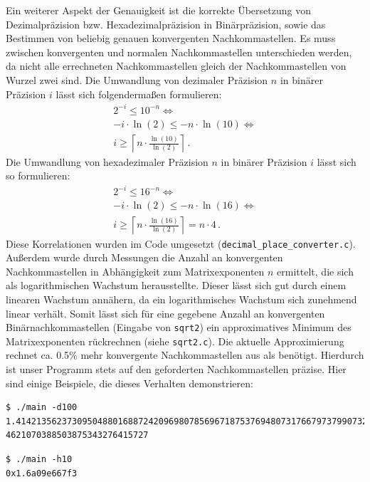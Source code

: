 \documentclass[course=erap]{aspdoc}
\begin{document}
Ein weiterer Aspekt der Genauigkeit ist die korrekte Übersetzung von Dezimalpräzision bzw. Hexadezimalpräzision in Binärpräzision, sowie das Bestimmen von beliebig genauen konvergenten Nachkommastellen. Es muss zwischen konvergenten und normalen Nachkommastellen unterschieden werden, da nicht alle errechneten Nachkommastellen gleich der Nachkommastellen von Wurzel zwei sind.
Die Umwandlung von dezimaler Präzision $n$ in binärer Präzision $i$ lässt sich folgendermaßen formulieren:
\begin{align}
  2^{-i} \leq 10^{-n} \Leftrightarrow \nonumber \\
    -i \cdot \ln(2) \leq -n \cdot \ln(10) \Leftrightarrow \nonumber \\
  i \geq \left\lceil n \cdot \frac{\ln(10)}{\ln(2)} \right\rceil \, . \nonumber
\end{align} 
Die Umwandlung von hexadezimaler Präzision $n$ in binärer Präzision $i$ lässt sich so formulieren:
\begin{align}
  2^{-i} \leq 16^{-n} \Leftrightarrow \nonumber \\
    -i \cdot \ln(2) \leq -n \cdot \ln(16) \Leftrightarrow \nonumber \\
  i \geq \left\lceil n \cdot \frac{\ln(16)}{\ln(2)}\right\rceil = n \cdot 4 \, . \nonumber
\end{align}
Diese Korrelationen wurden im Code umgesetzt (\texttt{decimal\_place\_converter.c}).
Außerdem wurde durch Messungen die Anzahl an konvergenten Nachkommastellen in Abhängigkeit zum Matrixexponenten $n$ ermittelt, die sich als logarithmischen Wachstum herausstellte. Dieser lässt sich gut durch einem linearen Wachstum annähern, da ein logarithmisches Wachstum sich zunehmend linear verhält. Somit lässt sich für eine gegebene Anzahl an konvergenten Binärnachkommastellen (Eingabe von \texttt{sqrt2}) ein approximatives Minimum des Matrixexponenten rückrechnen (siehe \texttt{sqrt2.c}). Die aktuelle Approximierung rechnet ca. 0.5\% mehr konvergente Nachkommastellen aus als benötigt. Hierdurch ist unser Programm stets auf den geforderten Nachkommastellen präzise.
Hier sind einige Beispiele, die dieses Verhalten demonstrieren:
%
\begin{verbatim}
$ ./main -d100
1.414213562373095048801688724209698078569671875376948073176679737990732478
4621070388503875343276415727
\end{verbatim}
%
\begin{verbatim}
$ ./main -h10
0x1.6a09e667f3
\end{verbatim}
\end{document}
